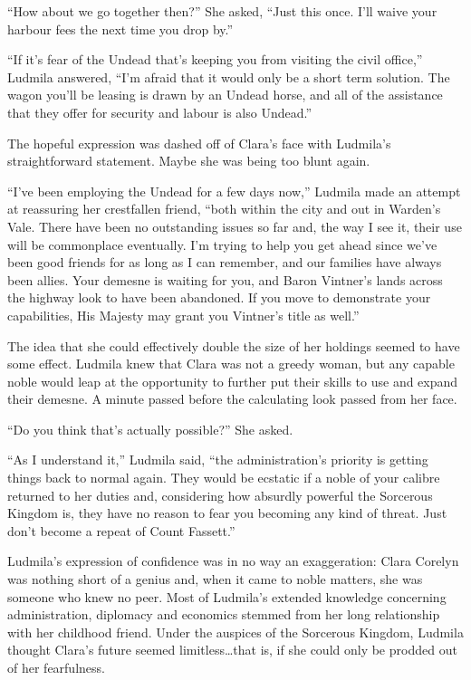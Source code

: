 

“How about we go together then?” She asked, “Just this once. I’ll waive your harbour fees the next time you drop by.”

 

“If it’s fear of the Undead that’s keeping you from visiting the civil office,” Ludmila answered, “I’m afraid that it would only be a short term solution. The wagon you’ll be leasing is drawn by an Undead horse, and all of the assistance that they offer for security and labour is also Undead.”

 

The hopeful expression was dashed off of Clara’s face with Ludmila’s straightforward statement. Maybe she was being too blunt again.

 

“I’ve been employing the Undead for a few days now,” Ludmila made an attempt at reassuring her crestfallen friend, “both within the city and out in Warden’s Vale. There have been no outstanding issues so far and, the way I see it, their use will be commonplace eventually. I’m trying to help you get ahead since we’ve been good friends for as long as I can remember, and our families have always been allies. Your demesne is waiting for you, and Baron Vintner’s lands across the highway look to have been abandoned. If you move to demonstrate your capabilities, His Majesty may grant you Vintner’s title as well.”

 

The idea that she could effectively double the size of her holdings seemed to have some effect. Ludmila knew that Clara was not a greedy woman, but any capable noble would leap at the opportunity to further put their skills to use and expand their demesne. A minute passed before the calculating look passed from her face.

 

“Do you think that’s actually possible?” She asked.

 

“As I understand it,” Ludmila said, “the administration’s priority is getting things back to normal again. They would be ecstatic if a noble of your calibre returned to her duties and, considering how absurdly powerful the Sorcerous Kingdom is, they have no reason to fear you becoming any kind of threat. Just don’t become a repeat of Count Fassett.”

 

Ludmila’s expression of confidence was in no way an exaggeration: Clara Corelyn was nothing short of a genius and, when it came to noble matters, she was someone who knew no peer. Most of Ludmila’s extended knowledge concerning administration, diplomacy and economics stemmed from her long relationship with her childhood friend. Under the auspices of the Sorcerous Kingdom, Ludmila thought Clara’s future seemed limitless…that is, if she could only be prodded out of her fearfulness.


